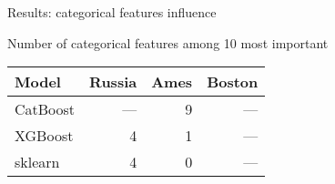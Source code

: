\begin{frame}{Results: categorical features influence}
	
	Number of categorical features among 10 most important
	\begin{table}
		\centering
		\begin{tabular}{lrrr}
			\toprule
			\textbf{Model} & \textbf{Russia} & \textbf{Ames} & \textbf{Boston} \\
			\midrule
			CatBoost & ---  & 9 & --- \\
			XGBoost & 4  & 1 & --- \\
			sklearn & 4 & 0 & --- \\
			\bottomrule
		\end{tabular}
	\end{table}
	
	
	
\end{frame}